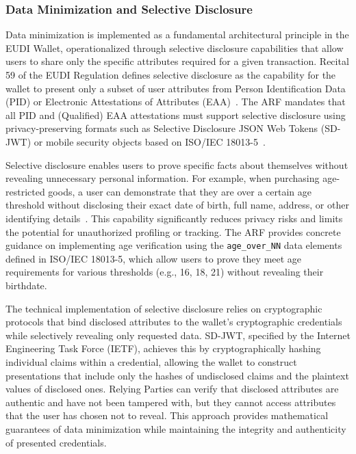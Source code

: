 \documentclass[sigconf,balance,nonacm,authordraft]{acmart}
\begin{document}
\subsubsection{Data Minimization and Selective Disclosure}

Data minimization is implemented as a fundamental architectural principle in the EUDI Wallet, operationalized through selective disclosure capabilities that allow users to share only the specific attributes required for a given transaction. Recital 59 of the EUDI Regulation defines selective disclosure as the capability for the wallet to present only a subset of user attributes from Person Identification Data (PID) or Electronic Attestations of Attributes (EAA)~\cite{ZKPDiscussion_Recital59,ARF_SelectDisclosureDefinition}. The ARF mandates that all PID and (Qualified) EAA attestations must support selective disclosure using privacy-preserving formats such as Selective Disclosure JSON Web Tokens (SD-JWT) or mobile security objects based on ISO/IEC 18013-5~\cite{ARF_AttestationSelectiveDisclosure}.

Selective disclosure enables users to prove specific facts about themselves without revealing unnecessary personal information. For example, when purchasing age-restricted goods, a user can demonstrate that they are over a certain age threshold without disclosing their exact date of birth, full name, address, or other identifying details~\cite{ISC2_SelectDisclosureExample,DocuSign_SelectDisclosure}. This capability significantly reduces privacy risks and limits the potential for unauthorized profiling or tracking. The ARF provides concrete guidance on implementing age verification using the \texttt{age\_over\_NN} data elements defined in ISO/IEC 18013-5, which allow users to prove they meet age requirements for various thresholds (e.g., 16, 18, 21) without revealing their birthdate.

The technical implementation of selective disclosure relies on cryptographic protocols that bind disclosed attributes to the wallet's cryptographic credentials while selectively revealing only requested data. SD-JWT, specified by the Internet Engineering Task Force (IETF), achieves this by cryptographically hashing individual claims within a credential, allowing the wallet to construct presentations that include only the hashes of undisclosed claims and the plaintext values of disclosed ones. Relying Parties can verify that disclosed attributes are authentic and have not been tampered with, but they cannot access attributes that the user has chosen not to reveal. This approach provides mathematical guarantees of data minimization while maintaining the integrity and authenticity of presented credentials.
\end{document}
